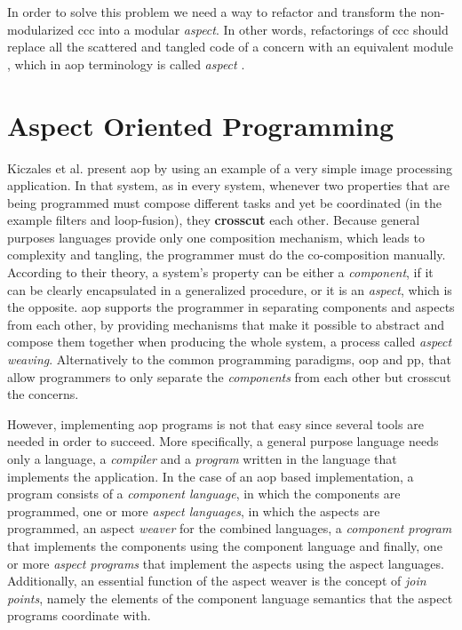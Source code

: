 In order to solve this problem we need a way to refactor and transform the non-modularized \ac{ccc} into a modular \textit{aspect}.
In other words, refactorings of \ac{ccc} should replace all the scattered and tangled code of a concern with an equivalent module \cite{hannemann2005role}, which in \ac{aop} terminology is called \textit{aspect} \cite{kiczales1997aspect}.

\section{Aspect Oriented Programming}\label{Aspect Oriented Programming}

Kiczales et al. present \ac{aop} \cite{kiczales1997aspect} by using an example of a very simple image processing application. 
In that system, as in every system, whenever two properties that are being programmed must compose different tasks and yet be coordinated (in the example filters and loop-fusion), they \textbf{crosscut} each other.
Because general purposes languages provide only one composition mechanism, which leads to complexity and tangling, the programmer must do the co-composition manually.
According to their theory, a system's property can be either a \textit{component}, if it can be clearly encapsulated in a generalized procedure, or it is an \textit{aspect}, which is the opposite.
\ac{aop} supports the programmer in separating components and aspects from each other, by providing mechanisms that make it possible to abstract and compose them together when producing the whole system, a process called \textit{aspect weaving}.
Alternatively to the common programming paradigms, \ac{oop} and \ac{pp}, that allow programmers to only separate the \textit{components} from each other but crosscut the concerns.

However, implementing \ac{aop} programs is not that easy since several tools are needed in order to succeed. 
More specifically, a general purpose language needs only a language, a \textit{compiler} and a \textit{program} written in the language that implements the application.
In the case of an \ac{aop} based implementation, a program consists of a \textit{component language}, in which the components are programmed, one or more \textit{aspect languages}, in which the aspects are programmed, an aspect \textit{weaver} for the combined languages, a \textit{component program} that implements the components using the component language and finally, one or more \textit{aspect programs} that implement the aspects using the aspect languages.
Additionally, an essential function of the aspect weaver is the concept of \textit{join points}, namely the elements of the component language semantics that the aspect programs coordinate with. 

